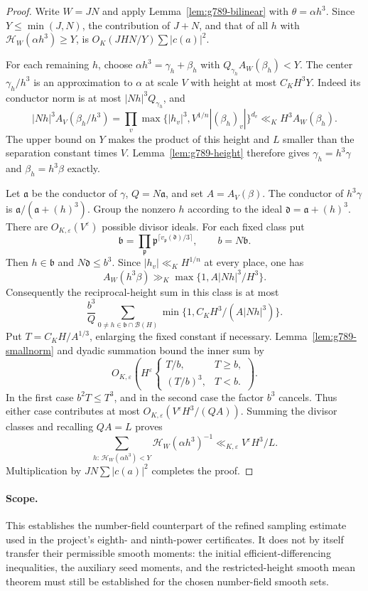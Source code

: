 \documentclass[11pt,reqno]{amsart}
\numberwithin{equation}{section}
\theoremstyle{definition}
\begin{document}
\begin{proof}
Write $W=JN$ and apply Lemma~\ref{lem:g789-bilinear} with
$\theta=\alpha h^3$. Since $Y\le\min(J,N)$, the contribution
of $J+N$, and that of all $h$ with $\mathcal H_W(\alpha h^3)\ge Y$,
is $O_K(JHN/Y)\sum|c(a)|^2$.

For each remaining $h$, choose
$\alpha h^3=\gamma_h+\beta_h$ with
$Q_{\gamma_h}A_W(\beta_h)<Y$. The center $\gamma_h/h^3$ is an
approximation to $\alpha$ at scale $V$ with height at most $C_KH^3Y$.
Indeed its conductor norm is at most $|Nh|^3Q_{\gamma_h}$, and
\[
 |Nh|^3 A_V(\beta_h/h^3)
 =\prod_v\max\{|h_v|^3,V^{1/n}|(\beta_h)_v|\}^{d_v}
 \ll_K H^3 A_W(\beta_h).
\]
The upper bound on $Y$ makes the product of this height and $L$
smaller than the separation constant times $V$.
Lemma~\ref{lem:g789-height} therefore gives
$\gamma_h=h^3\gamma$ and $\beta_h=h^3\beta$ exactly.

Let $\mathfrak a$ be the conductor of $\gamma$, $Q=N\mathfrak a$,
and set $A=A_V(\beta)$. The conductor of $h^3\gamma$ is
$\mathfrak a/(\mathfrak a+(h)^3)$. Group the nonzero $h$ according
to the ideal $\mathfrak d=\mathfrak a+(h)^3$.
There are $O_{K,\varepsilon}(V^\varepsilon)$ possible divisor ideals.
For each fixed class put
\[
 \mathfrak b=\prod_{\mathfrak p}
       \mathfrak p^{\lceil v_\mathfrak p(\mathfrak d)/3\rceil},
 \qquad b=N\mathfrak b.
\]
Then $h\in\mathfrak b$ and $N\mathfrak d\le b^3$.
Since $|h_v|\ll_KH^{1/n}$ at every place, one has
\[
 A_W(h^3\beta)\gg_K
       \max\{1,A|Nh|^3/H^3\}.
\]
Consequently the reciprocal-height sum in this class is at most
\[
 \frac{b^3}{Q}
 \sum_{0\ne h\in\mathfrak b\cap\mathcal B(H)}
       \min\{1,C_KH^3/(A|Nh|^3)\}.
\]
Put $T=C_KH/A^{1/3}$, enlarging the fixed constant if necessary.
Lemma~\ref{lem:g789-smallnorm} and dyadic summation bound the inner
sum by
\[
 O_{K,\varepsilon}\left(H^\varepsilon
 \begin{cases}T/b,&T\ge b,\\(T/b)^3,&T<b.\end{cases}\right).
\]
In the first case $b^2T\le T^3$, and in the second case the factor
$b^3$ cancels. Thus either case contributes at most
$O_{K,\varepsilon}(V^\varepsilon H^3/(QA))$.
Summing the divisor classes and recalling $QA=L$ proves
\[
 \sum_{h:\,\mathcal H_W(\alpha h^3)<Y}
       \mathcal H_W(\alpha h^3)^{-1}
 \ll_{K,\varepsilon}V^\varepsilon H^3/L.
\]
Multiplication by $JN\sum|c(a)|^2$ completes the proof.
\end{proof}

\paragraph{Scope.}
This establishes the number-field counterpart of the refined sampling
estimate used in the project's eighth- and ninth-power certificates.
It does not by itself transfer their permissible smooth moments:
the initial efficient-differencing inequalities, the auxiliary seed
moments, and the restricted-height smooth mean theorem must still be
established for the chosen number-field smooth sets.
\end{document}
